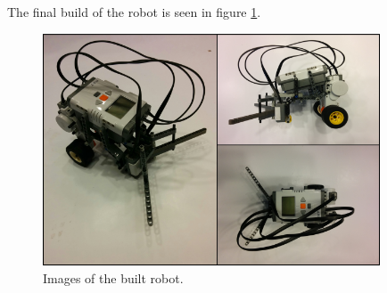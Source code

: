 \documentclass[12pt,a4paper]{article}
\begin{document}
The final build of the robot is seen in figure \ref{fig:robotImage}.

\begin{figure}[H]
\includegraphics[width=10cm]{Fig1.png}
\centering
\caption{Images of the built robot.}
\label{fig:robotImage}
\end{figure}



\end{document}
